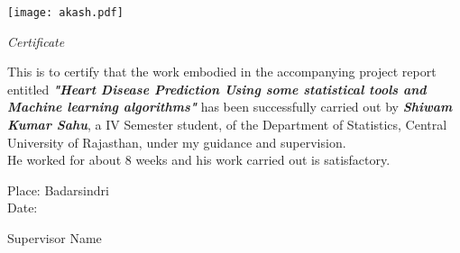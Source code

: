 \documentclass[12pt]{article}
\begin{document}
\newpage
{}
\texttt{[image: akash.pdf]}
\begin{doublespace}
\begin{center}
 \textit{{\LARGE Certificate}}
\end{center}
This is to certify that the work embodied in the accompanying project report entitled \textbf{\textit{"{Heart Disease Prediction Using some statistical tools and Machine learning algorithms}"}} has been successfully carried out by \textit{\textbf{Shiwam Kumar Sahu}}, a IV Semester student, of the Department of Statistics, Central University of Rajasthan, under my guidance and supervision.\\
He worked for about 8 weeks and his work carried out is satisfactory.
\vspace{15mm}
\begin{flushleft}
Place: Badarsindri\\
Date:
\end{flushleft}
\begin{flushright}
Supervisor Name
\end{flushright}
\end{doublespace}
\newpage
\end{document}
